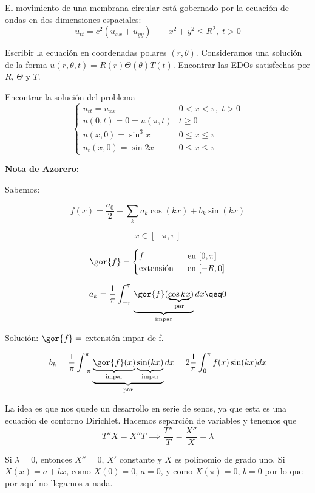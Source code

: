 \begin{problem} El movimiento de una membrana circular está gobernado por la ecuación de ondas en dos dimensiones espaciales: \[ u_{tt} = c^2(u_{xx} + u_{yy})\qquad x^2 + y^2 ≤ R^2, \; t > 0 \]

\ppart Escribir la ecuación en coordenadas polares $(r,θ)$.
\ppart Consideramos una solución de la forma $u(r,θ,t) = R(r)Θ(θ)T(t)$. Encontrar las EDOs satisfechas por $R$, $Θ$ y $T$.

\solution

\end{problem}

\begin{problem}[4] Encontrar la solución del problema \[ \begin{cases}
u_{tt} = u_{xx} 	& 0 < x < π,\; t > 0 \\
u(0,t) = 0 = u(π,t) & t ≥ 0 \\
u(x,0) = \sin^3 x	& 0 ≤ x ≤ π \\
u_t(x,0) = \sin 2x 	& 0 ≤ x ≤ π
\end{cases} \]

\solution

\textbf{Nota de Azorero:}

Sabemos:

\[f(x) =  \frac{a_0}{2} +\sum_k a_k \cos (kx) + b_k \sin(kx)  \]

\[ x \in [-\pi,\pi]\]

\[ \gor{f} = \begin{cases}
	f & \text{ en }[0,\pi] \\
	\text{extensión } & \text{ en } [-R,0]
\end{cases} \]

\[a_k = \frac{1}{\pi}  \int^{\pi}_{-\pi} \underbrace{\gor{f}(\underbrace{\cos kx}_{\text{par}}) }_{\text{impar}} dx \qeq 0 \]

Solución: $\gor{f} = $ extensión impar de f.

\[ b_k = \frac{1}{\pi} \int_{-\pi}^{\pi} \underbrace{\underbrace{\gor{f}(x)}_{\text{impar}} \underbrace{\sin(kx)}_{\text{impar}}}_{\text{par}} dx = 2 \frac{1}{\pi} \int^\pi_{0} f(x) \sin(kx) dx \]

La idea es que nos quede un desarrollo en serie de senos, ya que esta es una ecuación de contorno Dirichlet. Hacemos separción de variables y tenemos que \[ T''X = X''T \implies \frac{T''}{T} = \frac{X''}{X} = λ \]

Si $λ = 0$, entonces $X'' = 0$, $X'$ constante y $X$ es polinomio de grado uno. Si $X(x) = a + bx$, como $X(0) = 0$, $a = 0$, y como $X(π) = 0$, $b = 0$ por lo que por aquí no llegamos a nada.


\end{problem}
